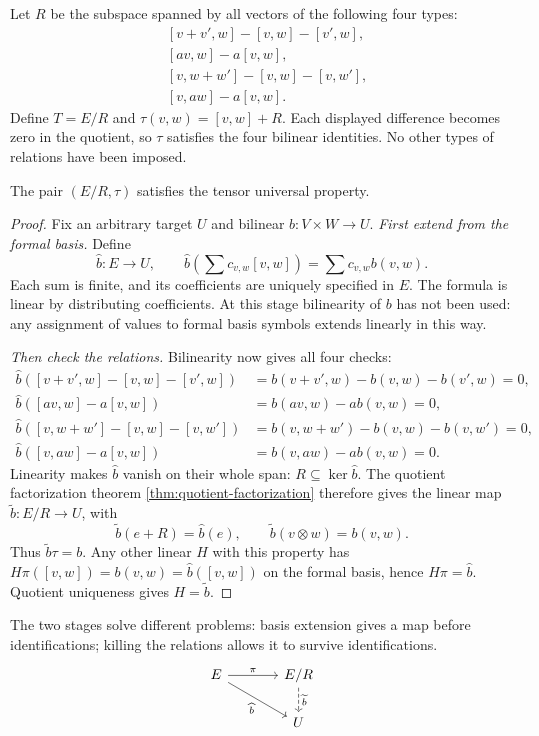 Let $R$ be the subspace spanned by all vectors of the following four types:
\begin{align*}
&[v+v',w]-[v,w]-[v',w],\\
&[av,w]-a[v,w],\\
&[v,w+w']-[v,w]-[v,w'],\\
&[v,aw]-a[v,w].
\end{align*}
Define $T=E/R$ and $\tau(v,w)=[v,w]+R$. Each displayed difference becomes
zero in the quotient, so $\tau$ satisfies the four bilinear identities.
No other types of relations have been imposed.
\begin{theorem}\label{thm:tensor-existence}
The pair $(E/R,\tau)$ satisfies the tensor universal property.
\end{theorem}
\begin{proof}
Fix an arbitrary target $U$ and bilinear $b:V\times W\to U$.
\emph{First extend from the formal basis.} Define
\[
\widehat b:E\to U,\qquad
\widehat b\left(\sum c_{v,w}[v,w]\right)=\sum c_{v,w}b(v,w).
\]
Each sum is finite, and its coefficients are uniquely specified in $E$.
The formula is linear by distributing coefficients. At this stage
bilinearity of $b$ has not been used: any assignment of values to formal
basis symbols extends linearly in this way.

\emph{Then check the relations.} Bilinearity now gives all four checks:
\begin{align*}
\widehat b([v+v',w]-[v,w]-[v',w])&=b(v+v',w)-b(v,w)-b(v',w)=0,\\
\widehat b([av,w]-a[v,w])&=b(av,w)-ab(v,w)=0,\\
\widehat b([v,w+w']-[v,w]-[v,w'])&=b(v,w+w')-b(v,w)-b(v,w')=0,\\
\widehat b([v,aw]-a[v,w])&=b(v,aw)-ab(v,w)=0.
\end{align*}
Linearity makes $\widehat b$ vanish on their whole span:
$R\subseteq\ker\widehat b$. The quotient factorization theorem
\cref{thm:quotient-factorization} therefore gives the linear map
$\widetilde b:E/R\to U$, with
\[
\widetilde b(e+R)=\widehat b(e),\qquad
\widetilde b(v\otimes w)=b(v,w).
\]
Thus $\widetilde b\tau=b$. Any other linear $H$ with this property has
$H\pi([v,w])=b(v,w)=\widehat b([v,w])$ on the formal basis, hence
$H\pi=\widehat b$. Quotient uniqueness gives $H=\widetilde b$.
\end{proof}
The two stages solve different problems: basis extension gives a map before
identifications; killing the relations allows it to survive identifications.
\[
\begin{tikzcd}[column sep=large]
E\arrow[r,"\pi"]\arrow[dr,"\widehat b"']&E/R\arrow[d,dashed,"\widetilde b"]\\
&U
\end{tikzcd}
\]

